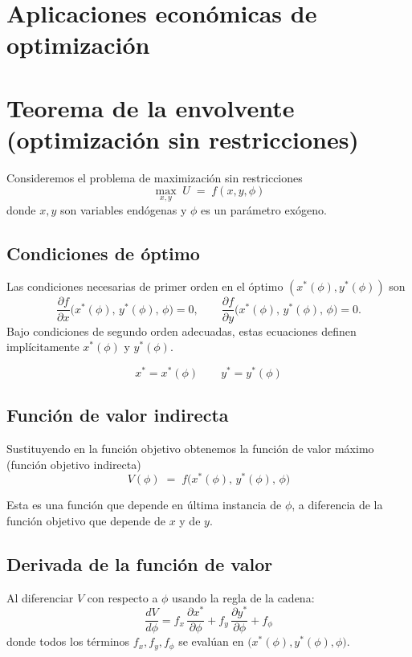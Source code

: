 \documentclass{article}
\begin{document}
\newpage

\section{Aplicaciones económicas de optimización}

\section*{Teorema de la envolvente (optimización sin restricciones)}

Consideremos el problema de maximización sin restricciones
\[
\max_{x,y}\;U \;=\;f(x,y,\phi)
\]
donde \(x,y\) son variables endógenas y \(\phi\) es un parámetro exógeno.  

\subsection*{Condiciones de óptimo}


Las condiciones necesarias de primer orden en el óptimo \((x^*(\phi),y^*(\phi))\) son
\begin{equation}\label{FOC}
\frac{\partial f}{\partial x}\bigl(x^*(\phi),\,y^*(\phi),\,\phi\bigr)=0,
\qquad
\frac{\partial f}{\partial y}\bigl(x^*(\phi),\,y^*(\phi),\,\phi\bigr)=0.
\end{equation}
Bajo condiciones de segundo orden adecuadas, estas ecuaciones definen implícitamente \(x^*(\phi)\) y \(y^*(\phi)\).

\[
x^*=x^*(\phi)
\qquad
y^*=y^*(\phi)
\]

\subsection*{Función de valor indirecta}

Sustituyendo en la función objetivo obtenemos la función de valor máximo (función objetivo indirecta)
\[
V(\phi) \;=\; f\bigl(x^*(\phi),\,y^*(\phi),\,\phi\bigr)
\]

Esta es una función que depende en última instancia de $\phi$, a diferencia de la función objetivo que depende de $x$ y de $y$.

\subsection*{Derivada de la función de valor}

Al diferenciar \(V\) con respecto a \(\phi\) usando la regla de la cadena:
\[
\frac{dV}{d\phi}
= f_x\,\frac{\partial x^*}{\partial\phi}
+ f_y\,\frac{\partial y^*}{\partial\phi}
+ f_\phi
\]
donde todos los términos \(f_x,f_y,f_\phi\) se evalúan en \(\bigl(x^*(\phi),y^*(\phi),\phi\bigr)\).  
\end{document}
